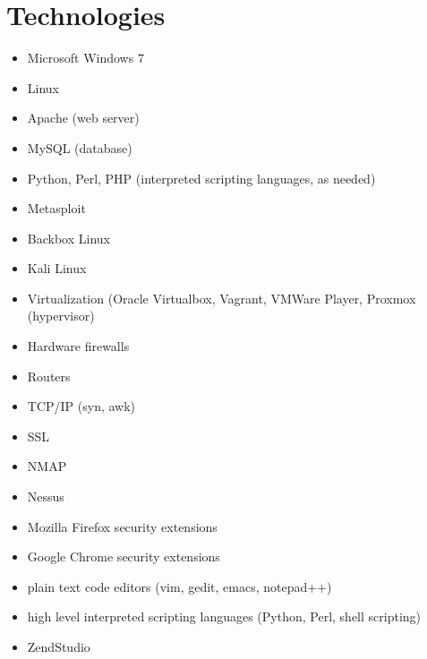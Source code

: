 \documentclass[letterpaper,10pt,english]{sphinxmanual}
\begin{document}
\section{Technologies}
\label{cybersecurity:technologies}\begin{itemize}
\item {} 
Microsoft Windows 7

\item {} 
Linux

\item {} 
Apache (web server)

\item {} 
MySQL (database)

\item {} 
Python, Perl, PHP (interpreted scripting languages, as needed)

\item {} 
Metasploit

\item {} 
Backbox Linux

\item {} 
Kali Linux

\item {} 
Virtualization (Oracle Virtualbox, Vagrant, VMWare Player, Proxmox (hypervisor)

\item {} 
Hardware firewalls

\item {} 
Routers

\item {} 
TCP/IP (syn, awk)

\item {} 
SSL

\item {} 
NMAP

\item {} 
Nessus

\item {} 
Mozilla Firefox security extensions

\item {} 
Google Chrome security extensions

\item {} 
plain text code editors (vim, gedit, emacs, notepad++)

\item {} 
high level interpreted scripting languages (Python, Perl, shell scripting)

\item {} 
ZendStudio


\end{itemize}
\end{document}
